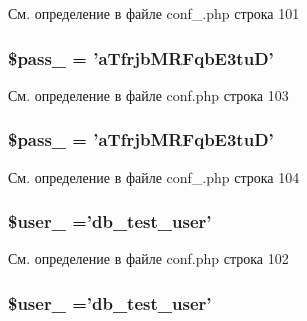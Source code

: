 См. определение в файле conf\-\_\-.\-php строка 101

\hypertarget{group___d_b__2_gab3a158e940b491fbf53fd8271fb05e45}{
\subsubsection[{\$pass\-\_\-2}]{\setlength{\rightskip}{0pt plus 5cm}\$pass\-\_ = 'a\-Tfrjb\-M\-R\-Fqb\-E3tu\-D'}}\label{group___d_b__2_gab3a158e940b491fbf53fd8271fb05e45}


См. определение в файле conf.\-php строка 103

\hypertarget{group___d_b__2_gab3a158e940b491fbf53fd8271fb05e45}{
\subsubsection[{\$pass\-\_\-2}]{\setlength{\rightskip}{0pt plus 5cm}\$pass\-\_ = 'a\-Tfrjb\-M\-R\-Fqb\-E3tu\-D'}}\label{group___d_b__2_gab3a158e940b491fbf53fd8271fb05e45}


См. определение в файле conf\-\_\-.\-php строка 104

\hypertarget{group___d_b__2_gaf33b43cdfbb1e0ca41bfd37425fc6bfe}{
\subsubsection[{\$user\-\_\-2}]{\setlength{\rightskip}{0pt plus 5cm}\$user\-\_ ='db\-\_\-test\-\_\-user'}}\label{group___d_b__2_gaf33b43cdfbb1e0ca41bfd37425fc6bfe}


См. определение в файле conf.\-php строка 102

\hypertarget{group___d_b__2_gaf33b43cdfbb1e0ca41bfd37425fc6bfe}{
\subsubsection[{\$user\-\_\-2}]{\setlength{\rightskip}{0pt plus 5cm}\$user\-\_ ='db\-\_\-test\-\_\-user'}}\label{group___d_b__2_gaf33b43cdfbb1e0ca41bfd37425fc6bfe}


